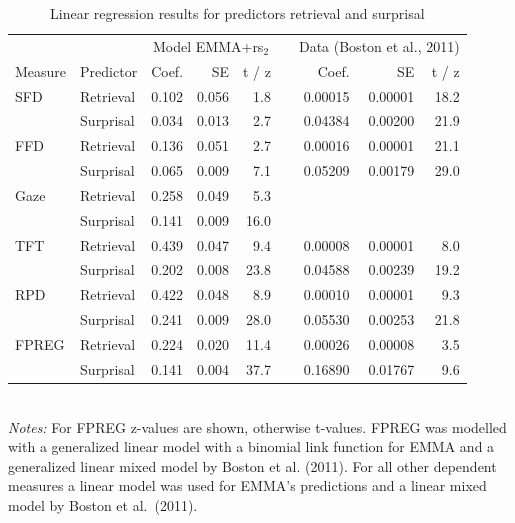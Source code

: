 \begin{subappendices}
\begin{table}
\caption{Linear regression results for predictors retrieval and surprisal} \label{lmtable}
\begin{tabular}{llrrrlrrr}
 & & \multicolumn{3}{c}{Model EMMA+rs$_2$} & & \multicolumn{3}{c}{Data (Boston et al., 2011)}  \\ \cline{3-5} \cline{7-9}
Measure & Predictor & Coef. & SE & t  / z &   & Coef. & SE & t / z \\ 
SFD & Retrieval & 0.102 & 0.056 & 1.8 &   & 0.00015 & 0.00001 & 18.2 \\ 
    & Surprisal & 0.034 & 0.013 & 2.7 &   & 0.04384 & 0.00200 & 21.9 \\ 
  FFD & Retrieval & 0.136 & 0.051 & 2.7 &   & 0.00016 & 0.00001 & 21.1 \\ 
    & Surprisal & 0.065 & 0.009 & 7.1 &   & 0.05209 & 0.00179 & 29.0 \\ 
  Gaze & Retrieval & 0.258 & 0.049 & 5.3 &   &  &  &  \\ 
    & Surprisal & 0.141 & 0.009 & 16.0 &   &  &  &  \\ 
  TFT & Retrieval & 0.439 & 0.047 & 9.4 &   & 0.00008 & 0.00001 & 8.0 \\ 
    & Surprisal & 0.202 & 0.008 & 23.8 &   & 0.04588 & 0.00239 & 19.2 \\ 
  RPD & Retrieval & 0.422 & 0.048 & 8.9 &   & 0.00010 & 0.00001 & 9.3 \\ 
    & Surprisal & 0.241 & 0.009 & 28.0 &   & 0.05530 & 0.00253 & 21.8 \\ 
  FPREG & Retrieval & 0.224 & 0.020 & 11.4 &   & 0.00026 & 0.00008 & 3.5 \\ 
    & Surprisal & 0.141 & 0.004 & 37.7 &   & 0.16890 & 0.01767 & 9.6 \\ 
\end{tabular} \\
{\footnotesize \emph{Notes:} For FPREG z-values are shown, otherwise t-values. FPREG was modelled with a generalized linear model with a binomial link function for EMMA and a generalized linear mixed model by Boston et al. (2011). For all other dependent measures a linear model was used for EMMA's predictions and a linear mixed model by Boston et al.\ (2011).}
\end{table}

\end{subappendices}
